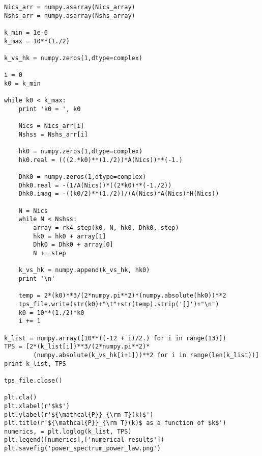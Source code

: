\documentclass[12pt,a4paper,oneside]{book}
\begin{document}
\begin{appendices}
\begin{small}
\begin{verbatim}
Nics_arr = numpy.asarray(Nics_array)
Nshs_arr = numpy.asarray(Nshs_array)

k_min = 1e-6
k_max = 10**(1./2)

k_vs_hk = numpy.zeros(1,dtype=complex)

i = 0
k0 = k_min

while k0 < k_max:
    print 'k0 = ', k0

    Nics = Nics_arr[i]
    Nshss = Nshs_arr[i]

    hk0 = numpy.zeros(1,dtype=complex)
    hk0.real = (((2.*k0)**(1./2))*A(Nics))**(-1.)

    Dhk0 = numpy.zeros(1,dtype=complex)
    Dhk0.real = -(1/A(Nics))*((2*k0)**(-1./2))
    Dhk0.imag = -((k0/2)**(1./2))/(A(Nics)*A(Nics)*H(Nics))
 
    N = Nics
    while N < Nshss:
        array = rk4_step(k0, N, hk0, Dhk0, step)
        hk0 = hk0 + array[1]
        Dhk0 = Dhk0 + array[0]
        N += step

    k_vs_hk = numpy.append(k_vs_hk, hk0) 
    print '\n'
    
    temp = 2*(k0)**3/(2*numpy.pi**2)*(numpy.absolute(hk0))**2
    tps_file.write(str(k0)+"\t"+str(temp).strip('[]')+"\n")
    k0 = 10**(1./2)*k0
    i += 1

k_list = numpy.array([10**((-12 + i)/2.) for i in range(13)])
TPS = [2*(k_list[i])**3/(2*numpy.pi**2)*
		(numpy.absolute(k_vs_hk[i+1]))**2 for i in range(len(k_list))]
print k_list, TPS

tps_file.close()

plt.cla()
plt.xlabel(r'$k$')
plt.ylabel(r'${\mathcal{P}}_{\rm T}(k)$')
plt.title(r'${\mathcal{P}}_{\rm T}(k)$ as a function of $k$')
numerics, = plt.loglog(k_list, TPS)
plt.legend([numerics],['numerical results'])
plt.savefig('power_spectrum_power_law.png')

\end{verbatim}
\end{small}
\end{appendices}
\end{document}
